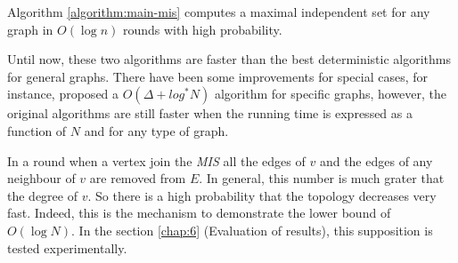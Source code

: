 \begin{theorem}

Algorithm \ref{algorithm:main-mis} computes a maximal independent set for any graph in $O(\log n)$ rounds with high probability.

\end{theorem}


 Until now, these two algorithms are faster than the best deterministic algorithms for general graphs. There have been some improvements for special cases, for instance, \cite{panconesi1996complexity} proposed a $O(\Delta + log^* N)$ algorithm for specific graphs, however, the original algorithms are still faster when the running time is expressed as a function of $N$ and for any type of graph.
 
 In a round when a vertex join the \textit{MIS} all the edges of $v$ and the edges of any neighbour of $v$ are removed from $E$. In general, this number is much grater that the degree of $v$. So there is a high probability that the topology decreases very fast. Indeed, this is the mechanism to demonstrate the lower bound of $O(\log N)$. In the section \ref{chap:6} (Evaluation of results), this supposition is tested experimentally. 
 

